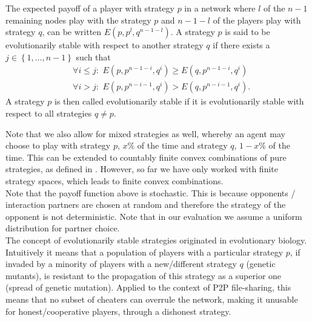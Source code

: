 \begin{definition}
The expected payoff of a player with strategy $p$ in a network where $l$ of the $n-1$ remaining nodes play with the strategy $p$ and $n-1-l$ of the players play with strategy $q$, can be written $E(p,p^l,q^{n-1-l})$. A strategy $p$ is said to be evolutionarily stable with respect to another strategy $q$ if there exists a $j\in\left\lbrace{}1,\ldots,n-1\right\rbrace$ such that
\begin{align}
&\forall{}i\leq{}j:\,\,E(p,p^{n-1-i},q^i)\geq{}E(q,p^{n-1-i},q^i)\\
&\forall{}i>j:\,\,E(p,p^{n-i-1},q^i) > E(q,p^{n-i-1},q^i).
\end{align}
A strategy $p$ is then called evolutionarily stable if it is evolutionarily stable with respect to all strategies $q\neq{}p$. \vspace{1em}\\
\end{definition}
\noindent{}Note that we also allow for mixed strategies as well, whereby an agent may choose to play with strategy $p$, $x\%$ of the time and strategy $q$, $1-x\%$ of the time. This can be extended to countably finite convex combinations of pure strategies, as defined in \cite{Game Theory}. However, so far we have only worked with finite strategy spaces, which leads to finite convex combinations. \vspace{1em}\\

\noindent{} Note that the payoff function above is stochastic. This is because opponents / interaction partners are chosen at random and therefore the strategy of the opponent is not deterministic. Note that in our evaluation we assume a uniform distribution for partner choice. \vspace{1em}\\

\noindent{}The concept of evolutionarily stable strategies originated in evolutionary biology. Intuitively it means that a population of players with a particular strategy $p$, if invaded by a minority of players with a new/different strategy $q$ (genetic mutants), is resistant to the propagation of this strategy as a superior one (spread of genetic mutation). Applied to the context of P2P file-sharing, this means that no subset of cheaters can overrule the network, making it unusable for honest/cooperative players, through a dishonest strategy.\vspace{1em}\\  

